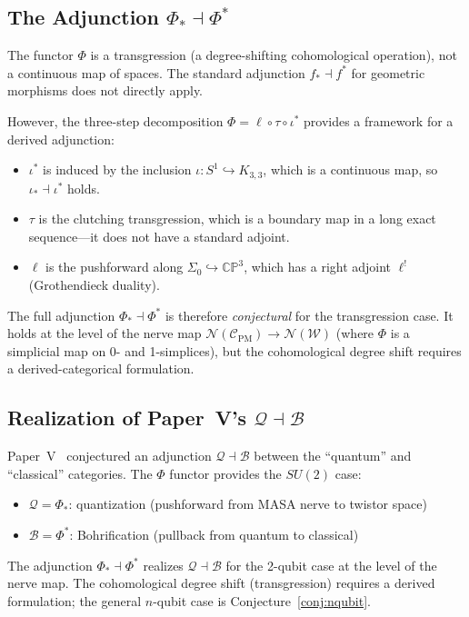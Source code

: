 \documentclass[11pt,a4paper]{article}
\theoremstyle{remark}
\newcommand{\CP}{\mathbb{CP}}
\newcommand{\cC}{\mathcal{C}}
\newcommand{\cN}{\mathcal{N}}
\newcommand{\cW}{\mathcal{W}}
\begin{document}
\subsection{The Adjunction $\Phi_* \dashv \Phi^*$}

The functor $\Phi$ is a transgression (a degree-shifting cohomological
operation), not a continuous map of spaces. The standard adjunction
$f_* \dashv f^*$ for geometric morphisms does not directly apply.

However, the three-step decomposition $\Phi = \ell \circ \tau \circ \iota^*$
provides a framework for a derived adjunction:
\begin{itemize}
  \item $\iota^*$ is induced by the inclusion $\iota: S^1 \hookrightarrow K_{3,3}$,
    which is a continuous map, so $\iota_* \dashv \iota^*$ holds.
  \item $\tau$ is the clutching transgression, which is a boundary map in
    a long exact sequence---it does not have a standard adjoint.
  \item $\ell$ is the pushforward along $\Sigma_0 \hookrightarrow \CP^3$,
    which has a right adjoint $\ell^!$ (Grothendieck duality).
\end{itemize}
The full adjunction $\Phi_* \dashv \Phi^*$ is therefore \emph{conjectural}
for the transgression case. It holds at the level of the nerve map
$\cN(\cC_{\text{PM}}) \to \cN(\cW)$ (where $\Phi$ is a simplicial map
on 0- and 1-simplices), but the cohomological degree shift requires a
derived-categorical formulation.

\subsection{Realization of Paper~V's $\mathcal{Q} \dashv \mathcal{B}$}

Paper~V~\cite{PaperV} conjectured an adjunction
$\mathcal{Q} \dashv \mathcal{B}$ between the ``quantum'' and
``classical'' categories. The $\Phi$ functor provides the $SU(2)$ case:
\begin{itemize}
  \item $\mathcal{Q} = \Phi_*$: quantization (pushforward from MASA nerve
    to twistor space)
  \item $\mathcal{B} = \Phi^*$: Bohrification (pullback from quantum to
    classical)
\end{itemize}
The adjunction $\Phi_* \dashv \Phi^*$ realizes $\mathcal{Q} \dashv
\mathcal{B}$ for the 2-qubit case at the level of the nerve map.
The cohomological degree shift (transgression) requires a derived
formulation; the general $n$-qubit case is Conjecture~\ref{conj:nqubit}.
\end{document}
